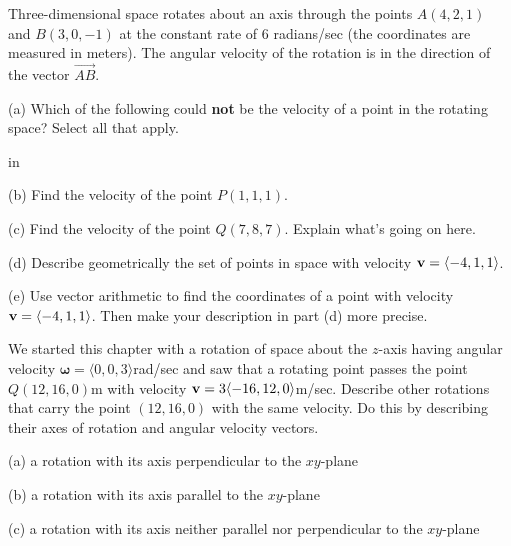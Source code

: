 \documentclass{ximera}
\newcommand{\pskip}{\vskip 0.1 in}
\begin{document}
\begin{question} \label{Qgdsnt:Cross}
Three-dimensional space rotates about an axis through the points $A(4,2,1)$ and $B(3,0,-1)$ at the constant rate of $6$ radians/sec (the coordinates are measured in meters). The angular velocity of the rotation is in the direction of the vector $\overrightarrow{AB}$. 

(a) Which of the following could {\bf not} be the velocity of a point in the rotating space? Select all that apply.

\begin{selectAll}  
  \end{selectAll}  


\pskip

(b) Find the velocity of the point $P(1,1,1)$.

(c) Find the velocity of the point $Q(7,8,7)$. Explain what's going on here.

(d) Describe geometrically the set of points in space with velocity ${\bf v} =\langle -4,1,1 \rangle$.

(e) Use vector arithmetic to find the coordinates of a point with velocity ${\bf v} =\langle -4,1,1 \rangle$. Then make your description in part (d) more precise.

\end{question}


\begin{exploration}


\end{exploration}



\begin{question}  \label{Q3254hv:Cross}
We started this chapter with a rotation of space about the $z$-axis having angular velocity $\boldsymbol{\omega} = \langle 0,0,3 \rangle$rad/sec and saw that a rotating point passes the point $Q(12,16,0)$m with velocity ${\bf v}= 3\langle -16,12,0\rangle$m/sec. Describe other rotations that carry the point $(12,16,0)$ with the same velocity. Do this by describing their axes of rotation and angular velocity vectors.

(a) a rotation with its axis perpendicular to the $xy$-plane

(b) a  rotation with its axis parallel to the $xy$-plane

(c) a rotation with its axis neither parallel nor perpendicular to the $xy$-plane
 
\end{question}
\end{document}
